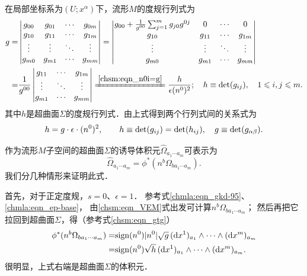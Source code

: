 在局部坐标系为$(U;x^\alpha)$下，流形$M$的度规行列式为
\begin{align*}
    g=&\begin{vmatrix}
        g_{00} & g_{01} & \cdots &g_{0m} \\
        g_{10} & g_{11} & \cdots &g_{1m} \\
        \vdots & \vdots & \ddots &\vdots \\
        g_{m0} & g_{m1} & \cdots &g_{mm}
    \end{vmatrix}
    =\begin{vmatrix}
        g_{00}+\frac{1}{g^{00}} \sum_{j=1}^{m} g_{j0} g^{0j}
         & 0 & \cdots & 0 \\
        g_{10} & g_{11} & \cdots &g_{1m} \\
        \vdots & \vdots & \ddots &\vdots \\
        g_{m0} & g_{m1} & \cdots &g_{mm}
    \end{vmatrix} \notag \\
    =&\frac{1}{g^{00}}
    \begin{vmatrix}
        g_{11} & \cdots &g_{1m} \\
        \vdots & \ddots &\vdots \\
        g_{m1} & \cdots &g_{mm}
    \end{vmatrix}
    \xlongequal{\ref{chsm:eqn_n0i=g}} \frac{h}{\epsilon (n^{0})^2} ;
    \quad h\equiv{\rm det}(g_{ij}), \quad 1 \leqslant i,j \leqslant m .
\end{align*}
其中$h$是超曲面$\Sigma$的度规行列式．由上式得到两个行列式间的关系式为
\begin{equation}\label{chsm:eqn_gtg}
    h = g\cdot \epsilon \cdot  (n^{0})^2 ,
    \qquad h\equiv{\rm det}(g_{ij})={\rm det}(h_{ij}), \quad g\equiv{\rm det}(g_{\alpha\beta}) .
\end{equation}

作为流形$M$子空间的超曲面$\Sigma$的{\heiti 诱导体积元}$\hat{\Omega}_{a_1 \cdots a_{m}}$可表示为
\begin{equation}\label{chsm:eqn_induced-VE}
    \hat{\Omega}_{a_1 \cdots a_{m}}= \phi^*( n^b \Omega_{b a_1 \cdots a_m} ).
\end{equation}
我们分几种情形来证明此式．

首先，对于正定度规，$s=0$、$\epsilon=1$．
参考式\eqref{chmla:eqn_gkd-95}、\eqref{chmla:eqn_ep-base}，
由\eqref{chsm:eqn_VEM}式出发可计算$n^b \Omega_{b a_1 \cdots a_m}$；
然后再把它拉回到超曲面$\Sigma$，得（参考式\eqref{chsm:eqn_gtg}）
\begin{equation}\label{chsm:eqn_induced-VE-positive}
\begin{aligned}
    \phi^*( n^b \Omega_{b a_1 \cdots a_m})=& {\rm sign}(n^0) |n^0| \sqrt{g}\,
     ({\rm d}x^1)_{a_1} \wedge \cdots \wedge({\rm d}x^m)_{a_m} \\
    =& {\rm sign}(n^0) \sqrt{h}\, ({\rm d}x^1)_{a_1} \wedge \cdots \wedge({\rm d}x^m)_{a_m}.
\end{aligned}
\end{equation}
很明显，上式右端是超曲面$\Sigma$的体积元．

